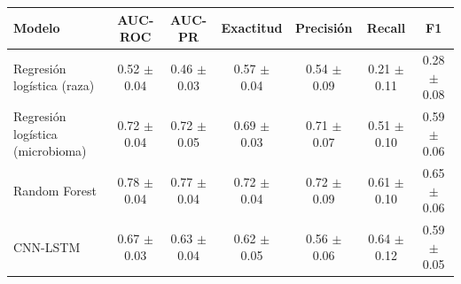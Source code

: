 \begin{tabular}{lcccccc}
        \toprule
        \textbf{Modelo} & \textbf{AUC-ROC} & \textbf{AUC-PR} & \textbf{Exactitud} & \textbf{Precisión} & \textbf{Recall} & \textbf{F1} \\
        \midrule
        Regresión logística (raza) & 0.52 $\pm$ 0.04 & 0.46 $\pm$ 0.03 & 0.57 $\pm$ 0.04 & 0.54 $\pm$ 0.09 & 0.21 $\pm$ 0.11 & 0.28 $\pm$ 0.08 \\
        Regresión logística (microbioma) & 0.72 $\pm$ 0.04 & 0.72 $\pm$ 0.05 & 0.69 $\pm$ 0.03 & 0.71 $\pm$ 0.07 & 0.51 $\pm$ 0.10 & 0.59 $\pm$ 0.06 \\
        Random Forest & 0.78 $\pm$ 0.04 & 0.77 $\pm$ 0.04 & 0.72 $\pm$ 0.04 & 0.72 $\pm$ 0.09 & 0.61 $\pm$ 0.10 & 0.65 $\pm$ 0.06 \\
        CNN-LSTM & 0.67 $\pm$ 0.03 & 0.63 $\pm$ 0.04 & 0.62 $\pm$ 0.05 & 0.56 $\pm$ 0.06 & 0.64 $\pm$ 0.12 & 0.59 $\pm$ 0.05 \\
        \bottomrule
    \end{tabular}
